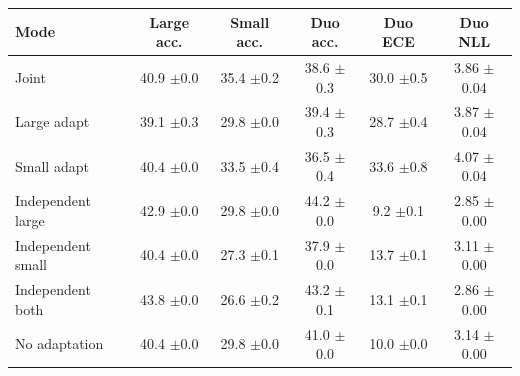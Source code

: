 \begin{table}[t]
\begin{tabular}{lccccc}
        \toprule
        Mode & Large acc. & Small acc. & Duo acc. & Duo ECE & Duo NLL \\
        \midrule
        Joint & 40.9 {\scriptsize$\pm$0.0} & 35.4 {\scriptsize$\pm$0.2} & 38.6 {\scriptsize$\pm$0.3} & 30.0 {\scriptsize$\pm$0.5} & 3.86 {\scriptsize$\pm$0.04} \\
        Large adapt & 39.1 {\scriptsize$\pm$0.3} & 29.8 {\scriptsize$\pm$0.0} & 39.4 {\scriptsize$\pm$0.3} & 28.7 {\scriptsize$\pm$0.4} & 3.87 {\scriptsize$\pm$0.04} \\
        Small adapt & 40.4 {\scriptsize$\pm$0.0} & 33.5 {\scriptsize$\pm$0.4} & 36.5 {\scriptsize$\pm$0.4} & 33.6 {\scriptsize$\pm$0.8} & 4.07 {\scriptsize$\pm$0.04} \\
        \midrule
        Independent large & 42.9 {\scriptsize$\pm$0.0} & 29.8 {\scriptsize$\pm$0.0} & 44.2 {\scriptsize$\pm$0.0} & 9.2 {\scriptsize$\pm$0.1} & 2.85 {\scriptsize$\pm$0.00} \\
        Independent small & 40.4 {\scriptsize$\pm$0.0} & 27.3 {\scriptsize$\pm$0.1} & 37.9 {\scriptsize$\pm$0.0} & 13.7 {\scriptsize$\pm$0.1} & 3.11 {\scriptsize$\pm$0.00} \\
        Independent both & 43.8 {\scriptsize$\pm$0.0} & 26.6 {\scriptsize$\pm$0.2} & 43.2 {\scriptsize$\pm$0.1} & 13.1 {\scriptsize$\pm$0.1} & 2.86 {\scriptsize$\pm$0.00} \\
        \midrule
        No adaptation & 40.4 {\scriptsize$\pm$0.0} & 29.8 {\scriptsize$\pm$0.0} & 41.0 {\scriptsize$\pm$0.0} & 10.0 {\scriptsize$\pm$0.0} & 3.14 {\scriptsize$\pm$0.00} \\
        \bottomrule
    \end{tabular}
\end{table}
